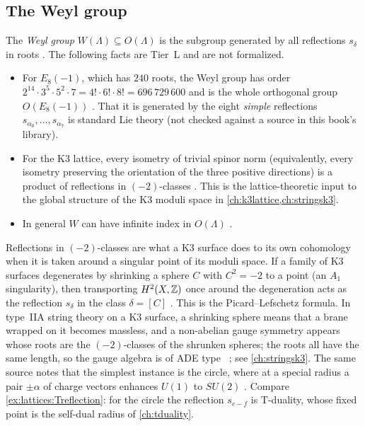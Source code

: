 \subsection{The Weyl group}
The \emph{Weyl group} $W(\Lambda)\subseteq O(\Lambda)$ is the subgroup
generated by all reflections $s_\delta$ in roots . The
following facts are Tier~L and are not formalized.
\begin{itemize}[leftmargin=*,itemsep=1pt]
\item For $E_8(-1)$, which has $240$ roots, the Weyl group has order
 $2^{14}\cdot3^5\cdot5^2\cdot7=4!\cdot6!\cdot8!=696\,729\,600$ and is the whole orthogonal
 group $O(E_8(-1))$ . That it is generated by the
 eight \emph{simple} reflections $s_{\alpha_0},\dots,s_{\alpha_7}$ is standard Lie theory
 (not checked against a source in this book's library).
\item For the K3 lattice, every isometry of trivial spinor norm (equivalently, every
 isometry preserving the orientation of the three positive directions) is a product of
 reflections in $(-2)$-classes . This is the lattice-theoretic input to the global structure of the K3
 moduli space in \cref{ch:k3lattice,ch:stringsk3}.
\item In general $W$ can have infinite index in $O(\Lambda)$ .
\end{itemize}

\begin{physicsbox}
Reflections in $(-2)$-classes are what a K3 surface does to its own cohomology when it is
taken around a singular point of its moduli space. If a family of K3 surfaces degenerates by
shrinking a sphere $C$ with $C^2=-2$ to a point (an $A_1$ singularity), then transporting
$H^2(X,\mathbb{Z})$ once around the degeneration acts as the reflection $s_\delta$ in the class
$\delta=[C]$ . This is the Picard--Lefschetz
formula. In type~IIA string theory on a K3 surface, a
shrinking sphere means that a brane wrapped on it becomes massless, and a non-abelian gauge
symmetry appears whose roots are the $(-2)$-classes of the shrunken spheres; the roots all
have the same length, so the gauge algebra is of ADE type \TL\
; see \cref{ch:stringsk3}. The same source
notes that the simplest instance is the circle, where at a special radius a pair
$\pm\alpha$ of charge vectors enhances $U(1)$ to $SU(2)$ . Compare \cref{ex:lattices:Treflection}: for the circle the
reflection $s_{e-f}$ is T-duality, whose fixed point is the self-dual radius of
\cref{ch:tduality}.
\end{physicsbox}

